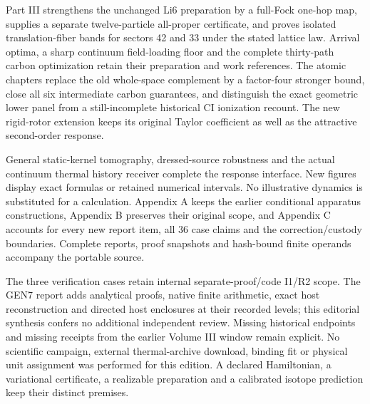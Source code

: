 Part III strengthens the unchanged Li6 preparation by a full-Fock one-hop
map, supplies a separate twelve-particle all-proper certificate, and proves
isolated translation-fiber bands for sectors 42 and 33 under the stated lattice
law. Arrival optima, a sharp continuum field-loading floor and the complete
thirty-path carbon optimization retain their preparation and work references.
The atomic chapters replace the old whole-space complement by a factor-four
stronger bound, close all six intermediate carbon guarantees, and distinguish
the exact geometric lower panel from a still-incomplete historical CI
ionization recount. The new rigid-rotor extension keeps its original Taylor
coefficient as well as the attractive second-order response.

General static-kernel tomography, dressed-source robustness and the actual
continuum thermal history receiver complete the response interface. New
figures display exact formulas or retained numerical intervals. No
illustrative dynamics is substituted for a calculation. Appendix A keeps
the earlier conditional apparatus constructions, Appendix B preserves their
original scope, and Appendix C accounts for every new report item, all 36
case claims and the correction/custody boundaries. Complete reports, proof
snapshots and hash-bound finite operands accompany the portable source.

The three verification cases retain internal separate-proof/code I1/R2
scope. The GEN7 report adds analytical proofs, native finite arithmetic,
exact host reconstruction and directed host enclosures at their recorded
levels; this editorial synthesis confers no additional independent review.
Missing historical endpoints and missing receipts from the earlier Volume
III window remain explicit. No scientific campaign, external thermal-archive
download, binding fit or physical unit assignment was performed for this
edition. A declared Hamiltonian, a variational certificate, a realizable
preparation and a calibrated isotope prediction keep their distinct premises.


